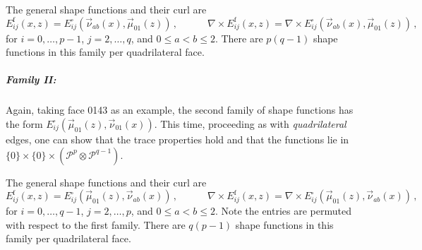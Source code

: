 The general shape functions and their curl are
\begin{equation}
		E_{ij}^{\mathrm{f}}(x,z)=E_{ij}^\square(\vec{\nu}_{ab}(x),\vec{\mu}_{01}(z))\,,\qquad\quad
		\nabla\times E_{ij}^{\mathrm{f}}(x,z)=\nabla\times E_{ij}^\square(\vec{\nu}_{ab}(x),\vec{\mu}_{01}(z))\,,
\end{equation}
for $i=0,\ldots,p-1$, $j=2,\ldots,q$, and $0\leq a<b\leq2$. 
There are $p(q-1)$ shape functions in this family per quadrilateral face.

\subparagraph{Family II:}
Again, taking face 0143 as an example, the second family of shape functions has the form $E_{ij}^\square(\vec{\mu}_{01}(z),\vec{\nu}_{01}(x))$.
This time, proceeding as with \textit{quadrilateral} edges, one can show that the trace properties hold and that the functions lie in $\{0\}\times\{0\}\times(\mathcal{P}^p\otimes\mathcal{P}^{q-1})$.

The general shape functions and their curl are
\begin{equation}
		E_{ij}^{\mathrm{f}}(x,z)=E_{ij}^\square(\vec{\mu}_{01}(z),\vec{\nu}_{ab}(x))\,,\qquad\quad
		\nabla\times E_{ij}^{\mathrm{f}}(x,z)=\nabla\times E_{ij}^\square(\vec{\mu}_{01}(z),\vec{\nu}_{ab}(x))\,,
\end{equation}
for $i=0,\ldots,q-1$, $j=2,\ldots,p$, and $0\leq a<b\leq2$. 
Note the entries are permuted with respect to the first family.
There are $q(p-1)$ shape functions in this family per quadrilateral face.

